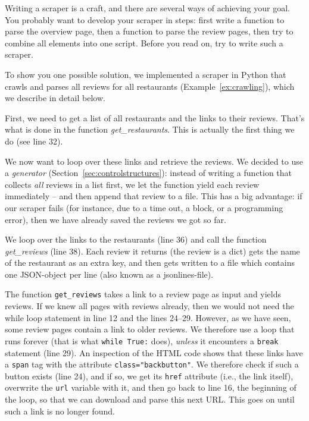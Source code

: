Writing a scraper is a craft, and there are several ways of achieving your goal.
You probably want to develop your scraper in steps: first write a function to
parse the overview page, then a function to parse the review pages, then try
to combine all elements into one script. Before you read on, try to write
such a scraper.

To show you one possible solution, we implemented a scraper in Python
that crawls and parses all reviews for all restaurants
(Example~\ref{ex:crawling}), which we describe in detail below.


First, we need to get a list of all restaurants and the links to their
reviews. That's what is done in the function \textit{get\_restaurants}. This
is actually the first thing we do (see line 32).

We now want to loop over these links and retrieve the reviews.  We
decided to use a \emph{generator} (Section~\ref{sec:controlstructures}): instead of writing a
function that collects \emph{all} reviews in a list first, we let the
function yield each review immediately -- and then append that review
to a file. This has a big advantage: if our scraper fails (for
instance, due to a time out, a block, or a programming error), then we
have already saved the reviews we got so far.

We loop over the links to the restaurants (line 36) and call the
function \textit{get\_reviews} (line 38). Each review it returns (the review
is a dict) gets the name of the restaurant as an extra key, and then
gets written to a file which contains one JSON-object per line (also
known as a jsonlines-file).

The function \verb|get_reviews| takes a link to a review page as input and
yields reviews. If we knew all pages with reviews already, then we
would not need the while loop statement in line 12 and the lines
24--29. However, as we have seen, some review pages contain a link to
older reviews. We therefore use a loop that runs forever (that is what
\verb|while True:| does), \emph{unless} it encounters a \verb|break| statement
(line 29).  An inspection of the HTML code shows that these links have
a \verb|span| tag with the attribute \verb|class="backbutton"|. We therefore
check if such a button exists (line 24), and if so, we get its \verb|href|
attribute (i.e., the link itself), overwrite the \verb|url| variable with
it, and then go back to line 16, the beginning of the loop, so that we
can download and parse this next URL.  This goes on until such a
link is no longer found.



